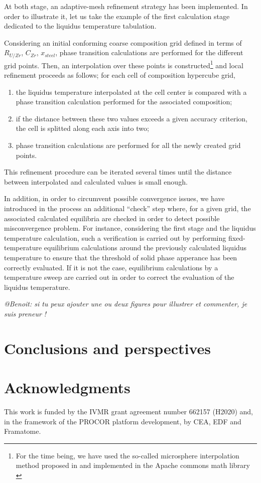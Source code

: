 \documentclass[11pt]{article}\usepackage{geometry} \geometry{letterpaper, margin=25.4mm}
\begin{document}
At both stage, an adaptive-mesh refinement strategy has been implemented. In order to illustrate it, let us take the example of the first calculation stage dedicated to the liquidus temperature tabulation. 

Considering an initial conforming coarse composition grid defined in terms of $R_{U/Zr}$, $C_{Zr}$, $x_{steel}$, phase transition calculations are performed for the different grid points. Then, an interpolation over these points is constructed\footnote{For the time being, we have used the so-called microsphere interpolation method proposed in \cite{Dudziak2007} and implemented in the Apache commons math library \cite{Apache2016}} and local refinement proceeds as follows; for each cell of composition hypercube grid,
\begin{enumerate}
 \item the liquidus temperature interpolated at the cell center is compared with a phase transition calculation performed for the associated composition;
 \item if the distance between these two values exceeds a given accuracy criterion, the cell is splitted along each axis into two;
 \item phase transition calculations are performed for all the newly created grid points.
\end{enumerate}
This refinement procedure can be iterated several times until the distance between interpolated and calculated values is small enough.

In addition, in order to circumvent possible convergence issues, we have introduced in the process an additional ``check'' step where, for a given grid, the associated calculated equilibria are checked in order to detect possible misconvergence problem. For instance, considering the first stage and the liquidus temperature calculation, such a verification is carried out by performing fixed-temperature equilibrium calculations around the previously calculated liquidus temperature to ensure that the threshold of solid phase apperance has been correctly evaluated. If it is not the case, equilibrium calculations by a temperature sweep are carried out in order to correct the evaluation of the liquidus temperature.

\emph{@Benoit: si tu peux ajouter une ou deux figures pour illustrer et commenter, je suis preneur !}


\section{Conclusions and perspectives} \label{sect:concl}

\section*{Acknowledgments}

This work is funded by the IVMR grant agreement number 662157 (H2020) and, in the framework of the PROCOR platform development, by CEA, EDF and Framatome.


\end{document}
